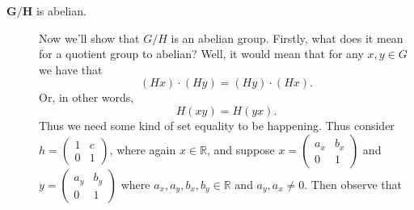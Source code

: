 \documentclass[12pt,letterpaper]{algebra_book}
\theoremstyle{definition}
\begin{document}
\begin{description}
    \item[$\bm{G/H}$ is abelian.] Now we'll show that $G/H$ is an
    abelian group. Firstly, what does it mean for a quotient group to
    abelian? Well, it would mean that for any $x, y \in G$ we have
    that 
    \[
        (Hx)\cdot(Hy) = (Hy)\cdot(Hx).
    \]
    Or, in other words, 
    \[
        H(xy) = H(yx).   
    \]
    Thus we need some kind of set equality to be happening. Thus
    consider $h =             \begin{pmatrix}
        1 & c \\
        0 & 1    
    \end{pmatrix}$, where again $x \in \mathbb{R}$, and suppose $x =             \begin{pmatrix}
        a_x & b_x \\
        0 & 1    
    \end{pmatrix}$ and $y =             \begin{pmatrix}
        a_y & b_y \\
        0 & 1    
    \end{pmatrix}$ where $a_x,a_y,b_x,b_y \in \mathbb{R}$ and $a_y,
    a_x \ne 0$. Then observe that 


\end{description}
\end{document}
